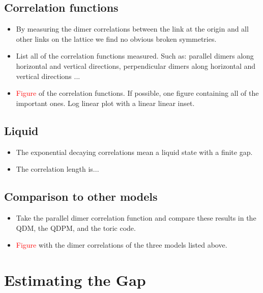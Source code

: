 \documentclass[aps,floatfix,11pt]{revtex4-1}
\begin{document}
    \subsection{Correlation functions}
        \begin{itemize}
            \item By measuring the dimer correlations between the link at the origin and all other
                links on the lattice we find no obvious broken symmetries.
            \item List all of the correlation functions measured. Such as: parallel dimers along
                horizontal and vertical directions, perpendicular dimers along horizontal and
                vertical directions ...
            \item \textcolor{red}{Figure} of the correlation functions. If possible, one figure
                containing all of the important ones. Log linear plot with a linear linear inset.
        \end{itemize}

    \subsection{Liquid}
        \begin{itemize}
            \item The exponential decaying correlations mean a liquid state with a finite gap.
            \item The correlation length is...
        \end{itemize}

    \subsection{Comparison to other models}
        \begin{itemize}
            \item Take the parallel dimer correlation function and compare these results in the QDM,
                the QDPM, and the toric code.
            \item \textcolor{red}{Figure} with the dimer correlations of the three models listed
                above.
        \end{itemize}

\clearpage
\section{Estimating the Gap}
\end{document}

